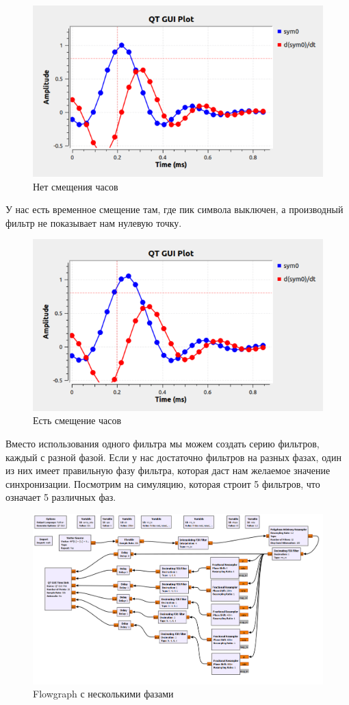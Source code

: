 \documentclass[a4paper, 14pt]{extarticle}
\begin{document}
    \begin{figure}[H]
        \centering
        \includegraphics[width=0.8\linewidth]{diff_filter_without}
        \caption{Нет смещения часов}
        \label{fig:diff_filter_without}
    \end{figure}

    У нас есть временное смещение там, где пик символа выключен, а производный фильтр не показывает нам нулевую точку.

    \begin{figure}[H]
        \centering
        \includegraphics[width=0.8\linewidth]{diff_filter_with}
        \caption{Есть смещение часов}
        \label{fig:diff_filter_with}
    \end{figure}

    Вместо использования одного фильтра мы можем создать серию фильтров, каждый с разной фазой.
    Если у нас достаточно фильтров на разных фазах, один из них имеет правильную фазу фильтра, которая даст нам желаемое значение синхронизации.
    Посмотрим на симуляцию, которая строит 5 фильтров, что означает 5 различных фаз.

    \begin{figure}[H]
        \centering
        \includegraphics[width=0.8\linewidth]{flowgraph_filter_diff_phase}
        \caption{Flowgraph с несколькими фазами}
        \label{fig:flowgraph_filter_diff_phase}
    \end{figure}
\end{document}
